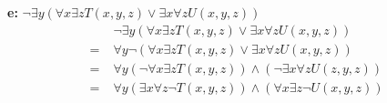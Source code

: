 \documentclass[a4paper, 11pt]{article}
\newcommand{\deloppg}[1]{\vspace{1mm}\noindent \textbf{\themecolor{#1:}}}
\newcommand{\themeshade}{Mahogany}
\newcommand{\themecolor}[1]{\textcolor{\themeshade}{#1}}
\begin{document}
\deloppg{e} $\neg \exists y (\forall x \exists z T(x,y,z) \lor \exists x \forall z U(x,y,z))$
\begin{align*}
     &\; \neg \exists y (\forall x \exists z T(x,y,z) \lor \exists x \forall z U(x,y,z)) \\
    =&\; \forall y \neg (\forall x \exists z T(x,y,z) \lor \exists x \forall z U(x,y,z)) \\
    =&\; \forall y (\neg \forall x \exists z T(x,y,z)) 
        \land (\neg \exists x \forall z U(z,y,z)) \\
    =&\; \forall y (\exists x \forall z \neg T(x,y,z))
        \land (\forall x \exists z \neg U(x,y,z)) \\
\end{align*}
\end{document}
